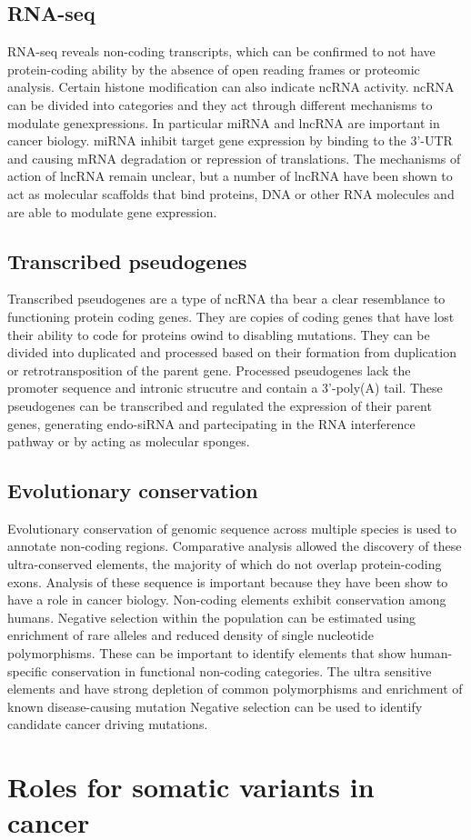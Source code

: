	\subsection{RNA-seq}
	RNA-seq reveals non-coding transcripts, which can be confirmed to not have protein-coding ability by the absence of open reading frames or proteomic analysis.
	Certain histone modification can also indicate ncRNA activity.
	ncRNA can be divided into categories and they act through different mechanisms to modulate genexpressions.
	In particular miRNA and lncRNA are important in cancer biology.
	miRNA inhibit target gene expression by binding to the 3'-UTR and causing mRNA degradation or repression of translations.
	The mechanisms of action of lncRNA remain unclear, but a number of lncRNA have been shown to act as molecular scaffolds that bind proteins, DNA or other RNA molecules and are able to modulate gene expression.

	\subsection{Transcribed pseudogenes}
	Transcribed pseudogenes are a type of ncRNA tha bear a clear resemblance to functioning protein coding genes.
	They are copies of coding genes that have lost their ability to code for proteins owind to disabling mutations.
	They can be divided into duplicated and processed based on their formation from duplication or retrotransposition of the parent gene.
	Processed pseudogenes lack the promoter sequence and intronic strucutre and contain a 3'-poly(A) tail.
	These pseudogenes can be transcribed and regulated the expression of their parent genes, generating endo-siRNA and partecipating in the RNA interference pathway or by acting as molecular sponges.

	\subsection{Evolutionary conservation}
	Evolutionary conservation of genomic sequence across multiple species is used to annotate non-coding regions.
	Comparative analysis allowed the discovery of these ultra-conserved elements, the majority of which do not overlap protein-coding exons.
	Analysis of these sequence is important because they have been show to have a role in cancer biology.
	Non-coding elements exhibit conservation among humans.
	Negative selection within the population can be estimated using enrichment of rare alleles and reduced density of single nucleotide polymorphisms.
	These can be important to identify elements that show human-specific conservation in functional non-coding categories.
	The ultra sensitive elements and have strong depletion of common polymorphisms and enrichment of known disease-causing mutation
	Negative selection can be used to identify candidate cancer driving mutations.

\section{Roles for somatic variants in cancer}
